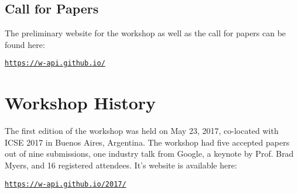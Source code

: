\documentclass[10pt, conference]{IEEEtran}
\newcommand{\updated}[1]{#1}
\begin{document}
\subsection{Call for Papers}
The preliminary website for the workshop as well as the call for papers can be found here:

\begin{center}
  \texttt{\url{https://w-api.github.io/}}
\end{center}

\section{Workshop History}

\updated{The first edition of the workshop was held on May 23, 2017, co-located with ICSE 2017 in Buenos Aires, Argentina. The workshop had five accepted papers out of nine submissions, one industry talk from Google, a keynote by Prof. Brad Myers, and 16 registered attendees. It's website is available here:}

\begin{center}
  \texttt{\url{https://w-api.github.io/2017/}}
\end{center}
\end{document}
